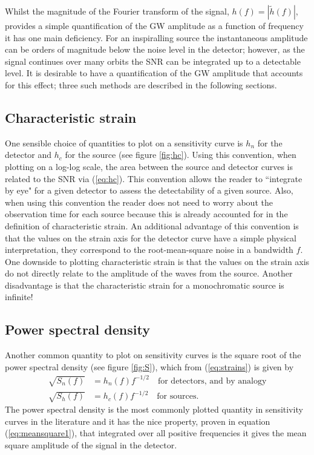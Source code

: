 Whilst the magnitude of the Fourier transform of the signal, $h(f)=\left|\tilde{h}(f)\right|$, provides a simple quantification of the GW amplitude as a function of frequency it has one main deficiency. For an inspiralling source the instantaneous amplitude can be orders of magnitude below the noise level in the detector; however, as the signal continues over many orbits the SNR can be integrated up to a detectable level. It is desirable to have a quantification of the GW amplitude that accounts for this effect; three such methods are described in the following sections.

\subsection{Characteristic strain}
One sensible choice of quantities to plot on a sensitivity curve is $h_{n}$ for the detector and $h_{c}$ for the source (see figure \ref{fig:hc}). Using this convention, when plotting on a log-log scale, the area between the source and detector curves is related to the SNR via (\ref{eq:hc}). This convention allows the reader to ``integrate by eye" for a given detector to assess the detectability of a given source. Also, when using this convention the reader does not need to worry about the observation time for each source because this is already accounted for in the definition of characteristic strain. An additional advantage of this convention is that the values on the strain axis for the detector curve have a simple physical interpretation, they correspond to the root-mean-square noise in a bandwidth $f$. One downside to plotting characteristic strain is that the values on the strain axis do not directly relate to the amplitude of the waves from the source. Another disadvantage is that the characteristic strain for a monochromatic source is infinite!


\subsection{Power spectral density}\label{sec:psd}
Another common quantity to plot on sensitivity curves is the square root of the power spectral density (see figure \ref{fig:S}), which from (\ref{eq:strains}) is given by
\begin{eqnarray}\label{eq:temp1} \sqrt{S_{n}(f)}&=h_{n}(f)f^{-1/2} \quad \textrm{for detectors, and by analogy} \\
\sqrt{S_{h}(f)}&=h_{c}(f)f^{-1/2} \quad \textrm{for sources.}\label{eq:ShforSources}\end{eqnarray}
The power spectral density is the most commonly plotted quantity in sensitivity curves in the literature and it has the nice property, proven in equation (\ref{eq:meansquare1}), that integrated over all positive frequencies it gives the mean square amplitude of the signal in the detector.

